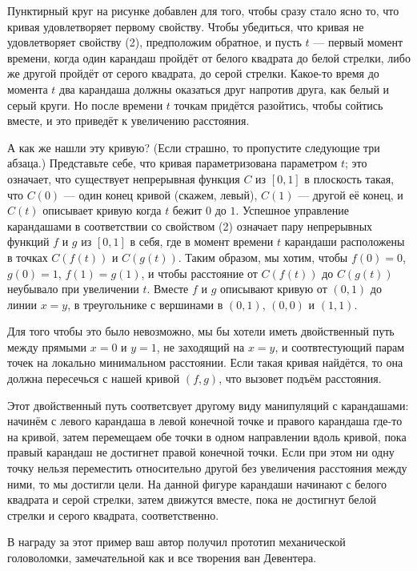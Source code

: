 Пунктирный круг на рисунке добавлен для того, чтобы сразу стало ясно то, что кривая удовлетворяет первому свойству.
Чтобы убедиться, что кривая не удовлетворяет свойству (2),
предположим обратное, и пусть $t$ --- первый момент времени, когда один карандаш пройдёт от белого квадрата до белой стрелки,
либо же другой пройдёт от серого квадрата, до серой стрелки.
Какое-то время до момента $t$ два карандаша должны оказаться друг напротив друга, как белый и серый круги.
Но после времени $t$ точкам придётся разойтись, чтобы сойтись вместе, и это приведёт к увеличению расстояния.

А как же нашли эту кривую?
(Если страшно, то пропустите следующие три абзаца.)
Представьте себе, что кривая параметризована параметром $t$;
это означает, что существует непрерывная функция $C$ из $[0, 1]$ в плоскость такая, что $C(0)$ --- один конец кривой (скажем, левый), $C(1)$ --- другой её конец, и $C(t)$ описывает кривую когда $t$ бежит $0$ до $1$.
Успешное управление карандашами в соответствии со свойством (2) означает пару непрерывных функций $f$ и $g$ из $[0,1]$ в себя, где в момент времени $t$ карандаши расположены в точках $C(f(t))$ и $C(g(t))$.
Таким образом, мы хотим, чтобы $f (0) = 0$, $g(0) = 1$, $f (1) = g(1)$, и чтобы расстояние от $C(f (t))$ до $C(g(t))$ неубывало при увеличении $t$.
Вместе $f$ и $g$ описывают кривую от $(0,1)$ до линии $x = y$, в треугольнике с вершинами в $(0,1)$, $(0,0)$ и $(1,1)$.

Для того чтобы это было невозможно, мы бы хотели иметь двойственный путь между прямыми $x = 0$ и $y = 1$, не заходящий на $x = y$, и соотвтестующий парам точек на локально минимальном расстоянии.
Если такая кривая найдётся, то она должна пересечься с нашей кривой $(f, g)$, что вызовет подъём расстояния.

Этот двойственный путь соответсвует другому виду манипуляций с карандашами:
начинём с левого карандаша в левой конечной точке и правого карандаша где-то на кривой,
затем перемещаем обе точки в одном направлении вдоль кривой, пока правый карандаш не достигнет правой конечной точки.
Если при этом ни одну точку нельзя переместить относительно другой без увеличения расстояния между ними, то мы достигли цели.
На данной фигуре карандаши начинают с белого квадрата и серой стрелки, затем движутся вместе, пока не достигнут белой стрелки и серого квадрата, соответственно.

В награду за этот пример ваш автор получил прототип механической головоломки, замечательной как и все творения ван Девентера.


